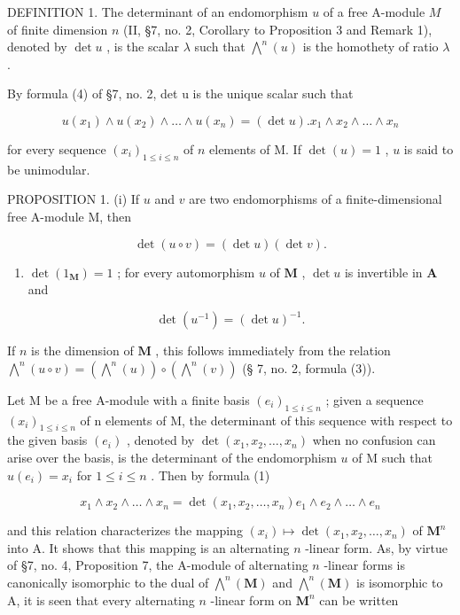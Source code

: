 DEFINITION 1. The determinant of an endomorphism \(u\) of a free A-module \(M\) of finite dimension \(n\) (II, §7, no. 2, Corollary to Proposition 3 and Remark 1), denoted by \(\det u\) , is the scalar \(\lambda\) such that \(\bigwedge^{n}(u)\) is the homothety of ratio \(\lambda\) .

By formula (4) of §7, no. 2, det u is the unique scalar such that

\[
u \left(x _ {1}\right) \wedge u \left(x _ {2}\right) \wedge \dots \wedge u \left(x _ {n}\right) = (\det u). x _ {1} \wedge x _ {2} \wedge \dots \wedge x _ {n}\tag{1}
\]

for every sequence \((x_{i})_{1\leqslant i\leqslant n}\) of \(n\) elements of M. If \(\det (u) = 1\) , \(u\) is said to be unimodular.

PROPOSITION 1. (i) If \(u\) and \(v\) are two endomorphisms of a finite-dimensional free A-module M, then

\[
\det (u \circ v) = (\det u) (\det v).\tag{2}
\]

\begin{enumerate}
\def\labelenumi{(\roman{enumi})}
\setcounter{enumi}{1}
\tightlist
\item
  \(\operatorname{det}(1_{\mathbf{M}}) = 1\) ; for every automorphism \(u\) of \(\mathbf{M}\) , \(\operatorname{det} u\) is invertible in \(\mathbf{A}\) and
\end{enumerate}

\[
\det (u ^ {- 1}) = (\det u) ^ {- 1}.\tag{3}
\]

If \(n\) is the dimension of \(\mathbf{M}\) , this follows immediately from the relation \(\bigwedge^{n}(u \circ v) = (\bigwedge^{n}(u)) \circ (\bigwedge^{n}(v))\) (§ 7, no. 2, formula (3)).

Let M be a free A-module with a finite basis \((e_{i})_{1\leqslant i\leqslant n}\) ; given a sequence \((x_{i})_{1\leqslant i\leqslant n}\) of n elements of M, the determinant of this sequence with respect to the given basis \((e_i)\) , denoted by \(\det(x_1, x_2, \ldots, x_n)\) when no confusion can arise over the basis, is the determinant of the endomorphism \(u\) of M such that \(u(e_i) = x_i\) for \(1 \leqslant i \leqslant n\) . Then by formula (1)

\[
x _ {1} \wedge x _ {2} \wedge \dots \wedge x _ {n} = \det (x _ {1}, x _ {2}, \dots , x _ {n}) e _ {1} \wedge e _ {2} \wedge \dots \wedge e _ {n}\tag{4}
\]

and this relation characterizes the mapping \((x_{i})\mapsto\det(x_{1},x_{2},\ldots,x_{n})\) of \(\mathbf{M}^{n}\) into A. It shows that this mapping is an alternating \(n\) -linear form. As, by virtue of §7, no. 4, Proposition 7, the A-module of alternating \(n\) -linear forms is canonically isomorphic to the dual of \(\bigwedge^{n}(\mathbf{M})\) and \(\bigwedge^{n}(\mathbf{M})\) is isomorphic to A, it is seen that every alternating \(n\) -linear form on \(\mathbf{M}^{n}\) can be written

